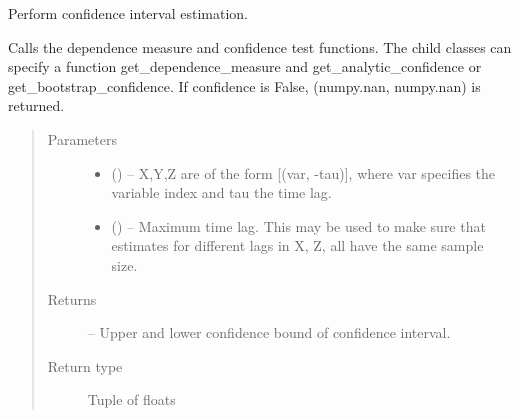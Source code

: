 \documentclass[letterpaper,10pt,english]{sphinxmanual}
\begin{document}
\begin{fulllineitems}
\begin{fulllineitems}
\begin{quote}
\begin{description}
\end{description}\end{quote}

\end{fulllineitems}


\begin{fulllineitems}
\label{\detokenize{index:tigramite.independence_tests.CondIndTest.get_confidence}}
Perform confidence interval estimation.

Calls the dependence measure and confidence test functions. The child
classes can specify a function get\_dependence\_measure and
get\_analytic\_confidence or get\_bootstrap\_confidence. If confidence is
False, (numpy.nan, numpy.nan) is returned.
\begin{quote}\begin{description}
\item[{Parameters}] \leavevmode\begin{itemize}
\item {} 
\sphinxstyleliteralstrong{, } (\sphinxstyleliteralemphasis{,}\sphinxstyleliteralemphasis{}) -- X,Y,Z are of the form {[}(var, -tau){]}, where var specifies the
variable index and tau the time lag.

\item {} 
 (\sphinxstyleliteralemphasis{, }\sphinxstyleliteralemphasis{ (}\sphinxstyleliteralemphasis{)}\sphinxstyleliteralemphasis{}) -- Maximum time lag. This may be used to make sure that estimates for
different lags in X, Z, all have the same sample size.

\end{itemize}

\item[{Returns}] \leavevmode
{} -- Upper and lower confidence bound of confidence interval.

\item[{Return type}] \leavevmode
Tuple of floats

\end{description}\end{quote}


\end{fulllineitems}
\end{fulllineitems}
\end{document}
